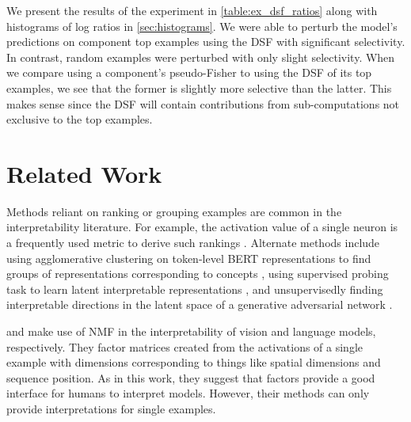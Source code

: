 \documentclass[dvipsnames]{article}
\begin{document}
We present the results of the experiment in \cref{table:ex_dsf_ratios} along with histograms of log ratios in \cref{sec:histograms}.
We were able to perturb the model's predictions on component top examples using the DSF with significant selectivity.
In contrast, random examples were perturbed with only slight selectivity.
When we compare using a component's pseudo-Fisher to using the DSF of its top examples, we see that the former is slightly more selective than the latter.
This makes sense since the DSF will contain contributions from sub-computations not exclusive to the top examples.




\section{Related Work}
Methods reliant on ranking or grouping examples are common in the interpretability literature.
For example, the activation value of a single neuron is a frequently used metric to derive such rankings \citep{sajjad2022neuron, bolukbasi2021interpretability, bau2017network, szegedy2013intriguing}.
Alternate methods include using agglomerative clustering on token-level BERT representations to find groups of representations corresponding to concepts , using supervised probing task to learn latent interpretable representations \citep{michael2020asking}, and unsupervisedly finding interpretable directions in the latent space of a generative adversarial network \citep{voynov2020unsupervised}.


 and \citet{alammar2020explaining} make use of NMF in the interpretability of vision and language models, respectively.
They factor matrices created from the activations of a single example with dimensions corresponding to things like spatial dimensions and sequence position.
As in this work, they suggest that factors provide a good interface for humans to interpret models.
However, their methods can only provide interpretations for single examples.
\end{document}
